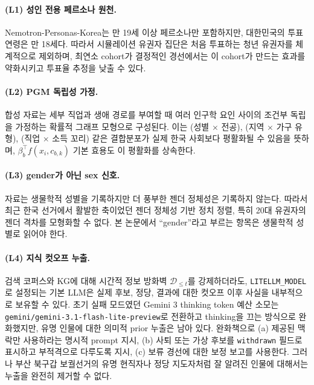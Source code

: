 \documentclass[11pt]{article}
\begin{document}
\paragraph{(L1) 성인 전용 페르소나 원천.}
Nemotron-Personas-Korea는 만 19세 이상 페르소나만 포함하지만, 대한민국의 투표연령은 만 18세다. 따라서 시뮬레이션 유권자 집단은 처음 투표하는 청년 유권자를 체계적으로 제외하며, 최연소 cohort가 결정적인 경선에서는 이 cohort가 만드는 효과를 약화시키고 투표율 추정을 낮출 수 있다.

\paragraph{(L2) PGM 독립성 가정.}
합성 자료는 세부 직업과 생애 경로를 부여할 때 여러 인구학 요인 사이의 조건부 독립을 가정하는 확률적 그래프 모형으로 구성된다. 이는 (성별 $\times$ 전공), (지역 $\times$ 가구 유형), (직업 $\times$ 소득 꼬리) 같은 결합분포가 실제 한국 사회보다 평활화될 수 있음을 뜻하며, $\beta_b^\top f(x_i, c_{b,k})$ 기본 효용도 이 평활화를 상속한다.

\paragraph{(L3) gender가 아닌 sex 신호.}
자료는 생물학적 성별을 기록하지만 더 풍부한 젠더 정체성은 기록하지 않는다. 따라서 최근 한국 선거에서 활발한 축이었던 젠더 정체성 기반 정치 정렬, 특히 20대 유권자의 젠더 격차를 모형화할 수 없다. 본 논문에서 ``gender''라고 부르는 항목은 생물학적 성별로 읽어야 한다.

\paragraph{(L4) 지식 컷오프 누출.}
검색 코퍼스와 KG에 대해 시간적 정보 방화벽 $\mathcal{D}_{\le t}$를 강제하더라도, \texttt{LITELLM\_MODEL}로 설정되는 기본 LLM은 실제 후보, 정당, 결과에 대한 컷오프 이후 사실을 내부적으로 보유할 수 있다. 초기 실패 모드였던 Gemini 3 thinking token 예산 소모는 \texttt{gemini/gemini-3.1-flash-lite-preview}로 전환하고 thinking을 끄는 방식으로 완화했지만, 유명 인물에 대한 의미적 prior 누출은 남아 있다. 완화책으로 (a) 제공된 맥락만 사용하라는 명시적 prompt 지시, (b) 사퇴 또는 가상 후보를 \texttt{withdrawn} 필드로 표시하고 부적격으로 다루도록 지시, (c) 보류 경선에 대한 보정 보고를 사용한다. 그러나 부산 북구갑 보궐선거의 유명 현직자나 정당 지도자처럼 잘 알려진 인물에 대해서는 누출을 완전히 제거할 수 없다.
\end{document}

